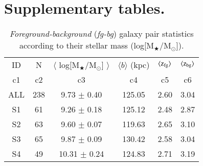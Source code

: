 \documentclass[longauth]{aa}
\begin{document}

\begin{appendix} \label{sec:Appendix} %
\section{Supplementary tables.} \label{sec:AppendixTbl}
\FloatBarrier
\begin{table}[h]
\centering
\caption{\label{tbl:PairsStat-STM}
\textit{Foreground-background} (\textit{fg-bg}) galaxy pair statistics 
according to their stellar mass (log[M$_{\bigstar}$/M$_{\odot}$]).}
\begin{tabular}{cccccc}
  \\
  \hline\hline
  \multicolumn{1}{c}{ID} &
  \multicolumn{1}{c}{N} &
  \multicolumn{1}{c}{$\langle$ log[M$_{\bigstar}$/M$_{\odot}$] $\rangle$} &
  \multicolumn{1}{c}{$\langle b \rangle$ (kpc)} & 
  \multicolumn{1}{c}{$\langle \rm{z}_{\rm{fg}}\rangle$} &
  \multicolumn{1}{c}{$\langle \rm{z}_{\rm{bg}}\rangle$} \\
  \multicolumn{1}{c}{c1} & 
  \multicolumn{1}{c}{c2} &
  \multicolumn{1}{c}{c3} &
  \multicolumn{1}{c}{c4} &
  \multicolumn{1}{c}{c5} &
  \multicolumn{1}{c}{c6} \\
  \hline\hline  
ALL & 238 &  9.73 $\pm$ 0.40 & 125.05 & 2.60 & 3.04\\
S1  &  61 &  9.26 $\pm$ 0.18 & 125.12 & 2.48 & 2.87 \\
S2  &  63 &  9.60 $\pm$ 0.07 & 119.63 & 2.65 & 3.10 \\
S3  &  65 &  9.87 $\pm$ 0.09 & 130.42 & 2.58 & 3.04 \\
S4  &  49 & 10.31 $\pm$ 0.24 & 124.83 & 2.71 & 3.19 \\
  \hline\hline
\end{tabular}
\end{table}


\end{appendix}
\end{document}
